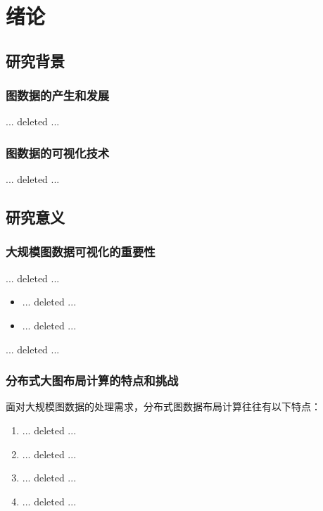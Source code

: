 \chapter{绪论}\label{chap:绪论}

\section{研究背景}

    \subsection{图数据的产生和发展}

    ... deleted ...





    \subsection{图数据的可视化技术}

    ... deleted ...




\section{研究意义}

    \subsection{大规模图数据可视化的重要性}

    ... deleted ...

    \begin{itemize}
        \item ... deleted ...
        \item ... deleted ...
    \end{itemize}

	... deleted ...

    \subsection{分布式大图布局计算的特点和挑战}

    面对大规模图数据的处理需求，分布式图数据布局计算往往有以下特点：

    \begin{enumerate}
      \item ... deleted ...
      \item ... deleted ...
      \item ... deleted ...
      \item ... deleted ...
    \end{enumerate}


